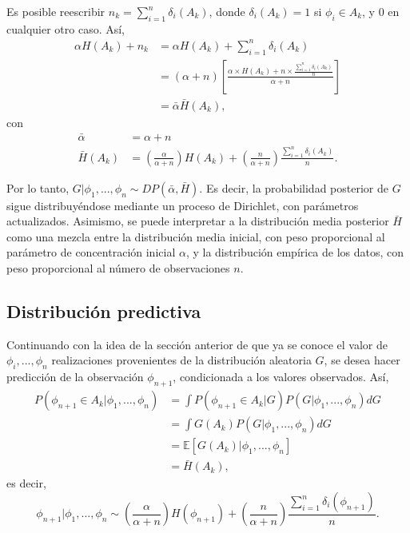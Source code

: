 Es posible reescribir $n_k = \sum_{i=1}^n \delta_i(A_k)$, donde $\delta_i(A_k) = 1$ si $\phi_i \in A_k$, y $0$ en cualquier otro caso. As\'i,
\begin{equation*}
\begin{aligned}
    \alpha H(A_k) + n_k 
    &= \alpha H(A_k) + \sum_{i=1}^n \delta_i(A_k) \\
    &= (\alpha + n)
    \left[
        \frac{\alpha \times H(A_k) + n \times \frac{\sum_{i=1}^n \delta_i(A_k)}{n}}{\alpha + n}
    \right] \\
    &= \bar{\alpha} \bar{H}(A_k),
\end{aligned}
\end{equation*}
con
\begin{equation*}
\begin{aligned}
    \bar{\alpha} &= \alpha + n \\
    \bar{H}(A_k) &=  
        \left(\frac{\alpha}{\alpha + n}\right)H(A_k) + 
        \left(\frac{n}{\alpha + n}\right)\frac{\sum_{i=1}^n \delta_i(A_k)}{n}.
\end{aligned}
\end{equation*}

Por lo tanto, $G|\phi_1,...,\phi_n \sim DP(\bar{\alpha},\bar{H})$. Es decir, la probabilidad posterior de $G$ sigue distribuy\'endose mediante un proceso de Dirichlet, con par\'ametros actualizados. Asimismo, se puede interpretar a la distribuci\'on media posterior $\bar{H}$ como una mezcla entre la distribuci\'on media inicial, con peso proporcional al par\'ametro de concentraci\'on inicial $\alpha$, y la distribuci\'on emp\'irica de los datos, con peso proporcional al n\'umero de observaciones $n$. 

\subsection{Distribuci\'on predictiva}

Continuando con la idea de la secci\'on anterior de que ya se conoce el valor de $\phi_i,...,\phi_n$ realizaciones provenientes de la distribuci\'on aleatoria $G$, se desea hacer predicci\'on de la observaci\'on $\phi_{n+1}$, condicionada a los valores observados. As\'i,
\begin{equation*}
\begin{aligned}
   P(\phi_{n+1} \in A_k|\phi_1,...,\phi_n)
   &= \int P(\phi_{n+1} \in A_k|G) P(G|\phi_1,...,\phi_n) dG \\ 
   &= \int G(A_k) P(G|\phi_1,...,\phi_n) dG \\ 
   &= \mathbb{E}[G(A_k)|\phi_1,...,\phi_n] \\
   &= \bar{H}(A_k),
\end{aligned}    
\end{equation*}
es decir, 
\begin{equation*}
    \phi_{n+1}|\phi_1,...,\phi_n \sim 
    \left(\frac{\alpha}{\alpha + n}\right)H(\phi_{n+1}) + 
    \left(\frac{n}{\alpha + n}\right)\frac{\sum_{i=1}^n \delta_i(\phi_{n+1})}{n}.
\end{equation*}

